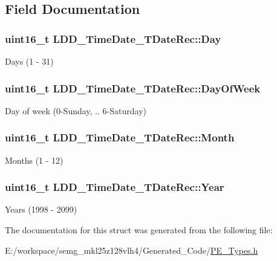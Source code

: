 \subsection{Field Documentation}
\hypertarget{struct_l_d_d___time_date___t_date_rec_a6f1463c1917d6fe55a492bdb85a6bd17}{
\subsubsection[{Day}]{\setlength{\rightskip}{0pt plus 5cm}uint16\-\_\-t L\-D\-D\-\_\-\-Time\-Date\-\_\-\-T\-Date\-Rec\-::\-Day}}\label{struct_l_d_d___time_date___t_date_rec_a6f1463c1917d6fe55a492bdb85a6bd17}
Days (1 -\/ 31) \hypertarget{struct_l_d_d___time_date___t_date_rec_a11ed8bc2e3fbd80252a7d4802d316f1c}{
\subsubsection[{Day\-Of\-Week}]{\setlength{\rightskip}{0pt plus 5cm}uint16\-\_\-t L\-D\-D\-\_\-\-Time\-Date\-\_\-\-T\-Date\-Rec\-::\-Day\-Of\-Week}}\label{struct_l_d_d___time_date___t_date_rec_a11ed8bc2e3fbd80252a7d4802d316f1c}
Day of week (0-\/\-Sunday, .. 6-\/\-Saturday) \hypertarget{struct_l_d_d___time_date___t_date_rec_a28aaeffe98b07d60db379d12269fa822}{
\subsubsection[{Month}]{\setlength{\rightskip}{0pt plus 5cm}uint16\-\_\-t L\-D\-D\-\_\-\-Time\-Date\-\_\-\-T\-Date\-Rec\-::\-Month}}\label{struct_l_d_d___time_date___t_date_rec_a28aaeffe98b07d60db379d12269fa822}
Months (1 -\/ 12) \hypertarget{struct_l_d_d___time_date___t_date_rec_a58eee644efb4f46adc3437063c7bc194}{
\subsubsection[{Year}]{\setlength{\rightskip}{0pt plus 5cm}uint16\-\_\-t L\-D\-D\-\_\-\-Time\-Date\-\_\-\-T\-Date\-Rec\-::\-Year}}\label{struct_l_d_d___time_date___t_date_rec_a58eee644efb4f46adc3437063c7bc194}
Years (1998 -\/ 2099) 

The documentation for this struct was generated from the following file\-:\begin{DoxyCompactItemize}
\item 
E\-:/workspace/semg\-\_\-mkl25z128vlh4/\-Generated\-\_\-\-Code/\hyperlink{_p_e___types_8h}{P\-E\-\_\-\-Types.\-h}\end{DoxyCompactItemize}
